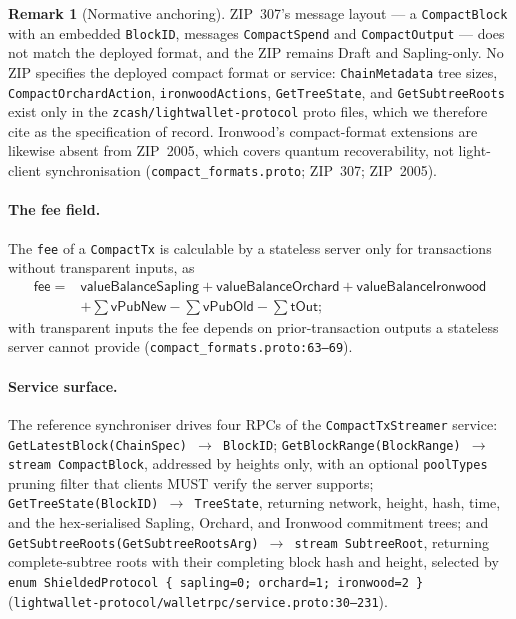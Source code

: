 \documentclass[11pt,a4paper]{article}
\theoremstyle{definition}
\newtheorem{remark}[theorem]{Remark}
\begin{document}
\begin{remark}[Normative anchoring]\label{rem:sync-spec-of-record}
ZIP~307's message layout --- a \texttt{CompactBlock} with an embedded
\texttt{BlockID}, messages \texttt{CompactSpend} and \texttt{CompactOutput}
--- does not match the deployed format, and the ZIP remains Draft and
Sapling-only. No ZIP specifies the deployed compact format or service:
\texttt{ChainMetadata} tree sizes, \texttt{CompactOrchardAction},
\texttt{ironwoodActions}, \texttt{GetTreeState}, and
\texttt{GetSubtreeRoots} exist only in the \texttt{zcash/lightwallet-protocol}
proto files, which we therefore cite as the specification of record.
Ironwood's compact-format extensions are likewise absent from ZIP~2005,
which covers quantum recoverability, not light-client synchronisation
(\texttt{compact\_formats.proto}; ZIP~307; ZIP~2005).
\end{remark}

\paragraph{The fee field.} The \texttt{fee} of a \texttt{CompactTx} is
calculable by a stateless server only for transactions without transparent
inputs, as
\[
\begin{aligned}
\mathsf{fee} = {} & \mathsf{valueBalanceSapling}
+ \mathsf{valueBalanceOrchard} + \mathsf{valueBalanceIronwood} \\
& + \textstyle\sum \mathsf{vPubNew} - \sum \mathsf{vPubOld}
- \sum \mathsf{tOut};
\end{aligned}
\]
with transparent inputs the fee depends on prior-transaction outputs a
stateless server cannot provide (\texttt{compact\_formats.proto:63--69}).

\paragraph{Service surface.} The reference synchroniser drives four RPCs of
the \texttt{CompactTxStreamer} service:
\texttt{GetLatestBlock(ChainSpec) $\to$ BlockID};
\texttt{GetBlockRange(BlockRange) $\to$ stream CompactBlock}, addressed by
heights only, with an optional \texttt{poolTypes} pruning filter that
clients MUST verify the server supports;
\texttt{GetTreeState(BlockID) $\to$ TreeState}, returning network, height,
hash, time, and the hex-serialised Sapling, Orchard, and Ironwood
commitment trees; and
\texttt{GetSubtreeRoots(GetSubtreeRootsArg) $\to$ stream SubtreeRoot},
returning complete-subtree roots with their completing block hash and
height, selected by \texttt{enum ShieldedProtocol \{ sapling=0; orchard=1;
ironwood=2 \}}
(\texttt{lightwallet-protocol/walletrpc/service.proto:30--231}).
\end{document}
